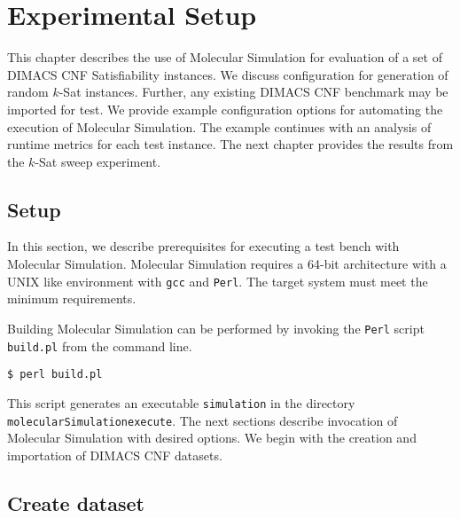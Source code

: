 \chapter{Experimental Setup}


This chapter describes the use of Molecular Simulation for evaluation of a set of DIMACS CNF {\sc Satisfiability} instances.  We discuss configuration for generation of random $k$-{\sc Sat} instances.  Further, any existing DIMACS CNF benchmark may be imported for test.  We provide example configuration options for automating the execution of Molecular Simulation.  The example continues with an analysis of runtime metrics for each test instance.  The next chapter provides the results from the $k$-{\sc Sat} sweep experiment.

	\section{Setup}


In this section, we describe prerequisites for executing a test bench with Molecular Simulation.  Molecular Simulation requires a 64-bit architecture with a UNIX like environment with \texttt{gcc} and \texttt{Perl}.  The target system must meet the minimum requirements.  

Building Molecular Simulation can be performed by invoking the \texttt{Perl} script \texttt{build.pl} from the command line.

\begin{center}
\texttt{\$ perl build.pl}
\end{center}

\noindent This script generates an executable \texttt{simulation} in the directory \texttt{molecularSimulationexecute}.  The next sections describe invocation of Molecular Simulation with desired options.  We begin with the creation and importation of DIMACS CNF datasets.

		

	\section{Create dataset}


